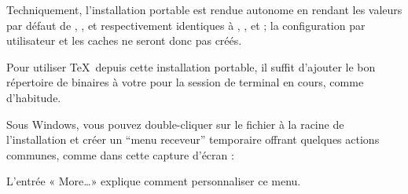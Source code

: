 \documentclass[german, english, french]{article}
\begin{document}
Techniquement, l'installation portable est rendue autonome en rendant les
valeurs par défaut de , , et
 respectivement identiques à ,
, et  ; la configuration par
utilisateur et les caches ne seront donc pas créés.

Pour utiliser \TeX\ depuis cette installation portable, il suffit d'ajouter le
bon répertoire de binaires à votre  pour la session de terminal en
cours, comme d'habitude.

Sous Windows, vous pouvez double-cliquer sur le fichier 
à la racine de l'installation et créer un \enquote{menu receveur} temporaire
offrant quelques actions communes, comme dans cette capture d'écran :

\medskip
{}
\smallskip

\noindent L'entrée « More\dots » explique comment personnaliser ce menu.
\end{document}
